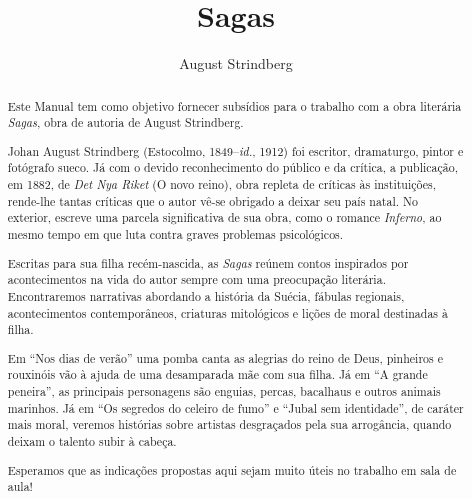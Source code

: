 \documentclass[12pt]{extarticle}
\begin{document}
\baselineskip\par


\newcommand{\AutorLivro}{August Strindberg}
\newcommand{\TituloLivro}{Sagas}
\newcommand{\Tema}{Ficção, mistério e fantasia}
\newcommand{\Genero}{Conto, crônica e novela}
\newcommand{\imagemCapa}{./images/PNLD0040-01.png}
\newcommand{\issnppub}{---}
\newcommand{\issnepub}{---}
\newcommand{\colaborador}{\textbf{Bruno Gradella e Vicente Castro}}


\title{\TituloLivro}
\author{\AutorLivro}
\def\authornotes{\colaborador}

\date{}
\maketitle

\begin{abstract}
Este Manual tem como objetivo fornecer subsídios para o trabalho com a
obra literária \emph{Sagas}, obra de autoria de August Strindberg.

Johan August Strindberg (Estocolmo, 1849--\textit{id.}, 1912) 
foi escritor, dramaturgo, pintor e fotógrafo sueco. Já com o devido
reconhecimento do público e da crítica, a publicação, em 1882, de 
\textit{Det Nya Riket} (O novo reino), obra repleta de críticas às 
instituições, rende-lhe tantas críticas que o autor vê-se obrigado
a deixar seu país natal. No exterior, escreve uma parcela significativa 
de sua obra, como o romance \textit{Inferno}, ao mesmo tempo em que 
luta contra graves problemas psicológicos.

Escritas para sua filha recém-nascida, as \textit{Sagas} reúnem contos
inspirados por acontecimentos na vida do autor sempre com uma preocupação 
literária. Encontraremos narrativas abordando a história da Suécia, fábulas 
regionais, acontecimentos contemporâneos, criaturas mitológicos e lições de 
moral destinadas à filha. 

Em ``Nos dias de verão'' uma pomba canta as alegrias do reino de Deus, 
pinheiros e rouxinóis vão à ajuda de uma desamparada mãe com sua filha. 
Já em ``A grande peneira'', as principais personagens são enguias, percas, 
bacalhaus e outros animais marinhos. Já em ``Os segredos do celeiro de fumo''
e ``Jubal sem identidade'', de caráter mais moral, veremos histórias sobre 
artistas desgraçados pela sua arrogância, quando deixam o talento subir à cabeça.

Esperamos que as indicações propostas aqui sejam muito úteis no trabalho em
sala de aula! 


\end{abstract}
\end{document}
